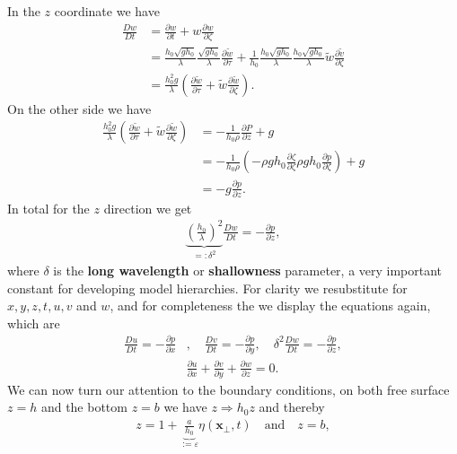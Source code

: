 In the $z$ coordinate we have
\begin{align}
    \frac{Dw}{Dt}
    &= \frac{\partial w}{\partial t} +w \frac{\partial
    w}{\partial \zeta} \\
    &= \frac{h_0\sqrt{gh_0}}{\lambda} \frac{\sqrt{gh_0}}{\lambda}
    \frac{\partial \tilde{w}}{\partial \tau}  + \frac{1}{h_0}
    \frac{h_0\sqrt{gh_0} }{\lambda} \frac{h_0\sqrt{gh_0}}{\lambda}
    \tilde{w}\frac{\partial \tilde{v}}{\partial \zeta}\\
    &= \frac{h_0^2g}{\lambda}\left( \frac{\partial \tilde{w}}{\partial \tau}
    + \tilde{w}\frac{\partial \tilde{w}}{\partial \zeta} \right) .
\end{align}
On the other side we have
\begin{align}
    \frac{h_0^2g}{\lambda}\left( \frac{\partial \tilde{w}}{\partial \tau}
    + \tilde{w}\frac{\partial \tilde{w}}{\partial \zeta} \right)
    &=
    -\frac{1}{h_0\rho} \frac{\partial P}{\partial z} +g \\
    &=-\frac{1}{h_0\rho}(-\rho gh_0 \frac{\partial \zeta}{\partial \zeta}
    \rho gh_0
    \frac{\partial p}{\partial \zeta} ) + g  \\
    &= -g \frac{\partial p}{\partial z}.
\end{align}
In total for the $z$ direction we get
\begin{align}
   \underbrace{\left( \frac{h_0}{\lambda} \right)^2}_{=: \delta^2}
    \frac{Dw}{Dt} = -\frac{\partial p}{\partial z},
\end{align}
where $\delta$ is the \textbf{long wavelength} or \textbf{shallowness}
parameter, a very important constant for developing model hierarchies. For
clarity we resubstitute for $x, y, z, t, u, v$ and $w$, and for completeness
the we display the equations again, which are
\begin{align}\label{eq:nondim-motion}
    \frac{Du}{Dt} = - \frac{\partial p}{\partial x}&, \quad
    \frac{Dv}{Dt} = - \frac{\partial p}{\partial y}, \quad
    \delta^2\frac{Dw}{Dt} = - \frac{\partial p}{\partial z}, \\
    &\frac{\partial u}{\partial x} + \frac{\partial v}{\partial y}
    +\frac{\partial w}{\partial z}  = 0.
\end{align}
We can now turn our attention to the boundary conditions, on both free
surface $z=h$ and the bottom $z=b$ we have $z \Rightarrow h_0 z$ and thereby
\begin{align}
    z = 1+
    \underbrace{\frac{a}{h_0}}_{:=\varepsilon}\eta(\mathbf{x}_\perp,t) \quad
    \text{and}\quad z= b,
\end{align}
